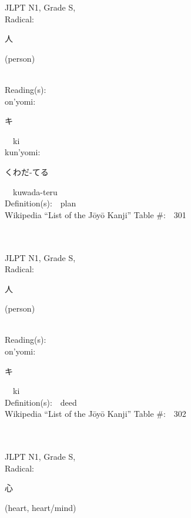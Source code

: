 \begin{multicols}{2}
{JLPT N1, Grade S, \\Radical:\ \ {\begin{CJK}{UTF8}{min} 人 \end{CJK}} (person) } \\
Reading(s):\ \ \\
{\hspace*{1em}}on'yomi:\ \ \\
{\hspace*{2em}}{\begin{CJK}{UTF8}{min} キ \end{CJK}}\ \ ki\ \ \\
{\hspace*{1em}}kun'yomi:\ \ \\
{\hspace*{2em}}{\begin{CJK}{UTF8}{min} くわだ-てる \end{CJK}}\ \ kuwada-teru\ \ \\
Definition(s):\ \ plan \\
Wikipedia ``List of the J\=oy\=o Kanji'' Table \#:\ \ 301 \\
\ \ \\
{\fontsize{34pt}{40pt}  }\ \ \\
{JLPT N1, Grade S, \\Radical:\ \ {\begin{CJK}{UTF8}{min} 人 \end{CJK}} (person) } \\
Reading(s):\ \ \\
{\hspace*{1em}}on'yomi:\ \ \\
{\hspace*{2em}}{\begin{CJK}{UTF8}{min} キ \end{CJK}}\ \ ki\ \ \\
Definition(s):\ \ deed \\
Wikipedia ``List of the J\=oy\=o Kanji'' Table \#:\ \ 302 \\
\ \ \\
{\fontsize{34pt}{40pt}  }\ \ \\
{JLPT N1, Grade S, \\Radical:\ \ {\begin{CJK}{UTF8}{min} 心 \end{CJK}} (heart, heart/mind) } \\

\end{multicols}
